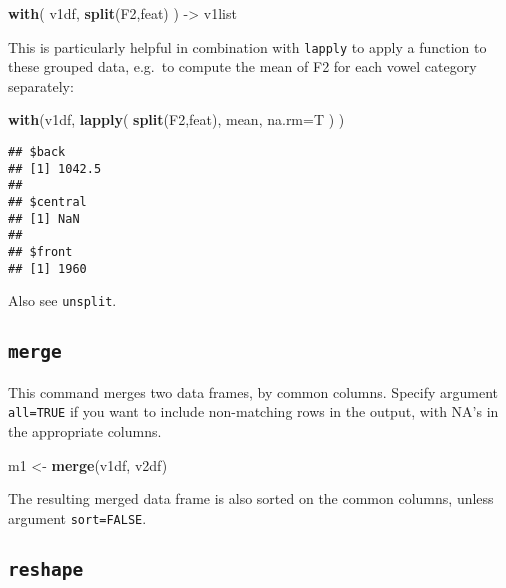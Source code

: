 \documentclass[]{book}
\newenvironment{Shaded}{\begin{snugshade}}{\end{snugshade}}
\newcommand{\DataTypeTok}[1]{\textcolor[rgb]{0.13,0.29,0.53}{#1}}
\newcommand{\KeywordTok}[1]{\textcolor[rgb]{0.13,0.29,0.53}{\textbf{#1}}}
\newcommand{\NormalTok}[1]{#1}
\newcommand{\StringTok}[1]{\textcolor[rgb]{0.31,0.60,0.02}{#1}}
\begin{document}
\begin{Shaded}
\begin{Highlighting}[]
\KeywordTok{with}\NormalTok{( v1df, }\KeywordTok{split}\NormalTok{(F2,feat) ) ->}\StringTok{ }\NormalTok{v1list }
\end{Highlighting}
\end{Shaded}

This is particularly helpful in combination with
\texttt{lapply} to apply a function to these grouped
data, e.g.~to compute the mean of F2 for each vowel category
separately:

\begin{Shaded}
\begin{Highlighting}[]
\KeywordTok{with}\NormalTok{(v1df, }\KeywordTok{lapply}\NormalTok{( }\KeywordTok{split}\NormalTok{(F2,feat), mean, }\DataTypeTok{na.rm=}\NormalTok{T ) ) }
\end{Highlighting}
\end{Shaded}

\begin{verbatim}
## $back
## [1] 1042.5
## 
## $central
## [1] NaN
## 
## $front
## [1] 1960
\end{verbatim}

Also see \texttt{unsplit}.

\hypertarget{merge}{%
\subsection{\texorpdfstring{\texttt{merge}}{merge}}\label{merge}}

This command merges two data frames, by common columns. Specify
argument \texttt{all=TRUE} if you want to include non-matching rows in the
output, with NA's in the appropriate columns.

\begin{Shaded}
\begin{Highlighting}[]
\NormalTok{m1 <-}\StringTok{ }\KeywordTok{merge}\NormalTok{(v1df, v2df)}
\end{Highlighting}
\end{Shaded}

The resulting merged data frame is also sorted on the common
columns, unless argument \texttt{sort=FALSE}.

\hypertarget{reshape}{%
\subsection{\texorpdfstring{\texttt{reshape}}{reshape}}\label{reshape}}
\end{document}
